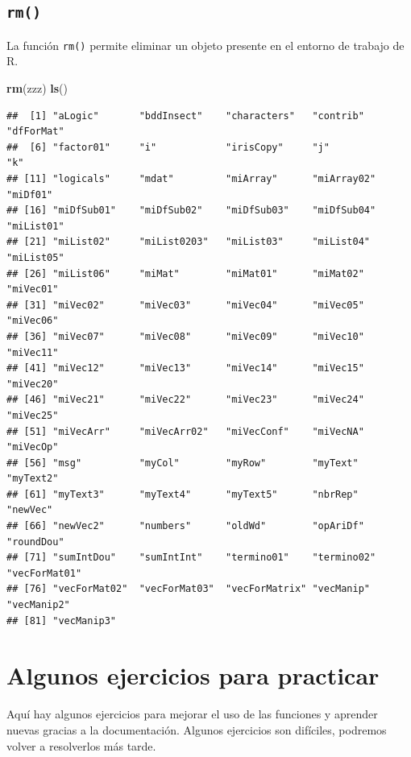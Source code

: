 \documentclass[
]{book}
\newenvironment{Shaded}{\begin{snugshade}}{\end{snugshade}}
\newcommand{\KeywordTok}[1]{\textcolor[rgb]{0.13,0.29,0.53}{\textbf{#1}}}
\newcommand{\NormalTok}[1]{#1}
\begin{document}
\hypertarget{l015rm}{%
\subsection{\texorpdfstring{\texttt{rm()}}{rm()}}\label{l015rm}}

La función \texttt{rm()} permite eliminar un objeto presente en el entorno de trabajo de R.

\begin{Shaded}
\begin{Highlighting}[]
\KeywordTok{rm}\NormalTok{(zzz)}
\KeywordTok{ls}\NormalTok{()}
\end{Highlighting}
\end{Shaded}

\begin{verbatim}
##  [1] "aLogic"       "bddInsect"    "characters"   "contrib"      "dfForMat"    
##  [6] "factor01"     "i"            "irisCopy"     "j"            "k"           
## [11] "logicals"     "mdat"         "miArray"      "miArray02"    "miDf01"      
## [16] "miDfSub01"    "miDfSub02"    "miDfSub03"    "miDfSub04"    "miList01"    
## [21] "miList02"     "miList0203"   "miList03"     "miList04"     "miList05"    
## [26] "miList06"     "miMat"        "miMat01"      "miMat02"      "miVec01"     
## [31] "miVec02"      "miVec03"      "miVec04"      "miVec05"      "miVec06"     
## [36] "miVec07"      "miVec08"      "miVec09"      "miVec10"      "miVec11"     
## [41] "miVec12"      "miVec13"      "miVec14"      "miVec15"      "miVec20"     
## [46] "miVec21"      "miVec22"      "miVec23"      "miVec24"      "miVec25"     
## [51] "miVecArr"     "miVecArr02"   "miVecConf"    "miVecNA"      "miVecOp"     
## [56] "msg"          "myCol"        "myRow"        "myText"       "myText2"     
## [61] "myText3"      "myText4"      "myText5"      "nbrRep"       "newVec"      
## [66] "newVec2"      "numbers"      "oldWd"        "opAriDf"      "roundDou"    
## [71] "sumIntDou"    "sumIntInt"    "termino01"    "termino02"    "vecForMat01" 
## [76] "vecForMat02"  "vecForMat03"  "vecForMatrix" "vecManip"     "vecManip2"   
## [81] "vecManip3"
\end{verbatim}

\hypertarget{algunos-ejercicios-para-practicar}{%
\section{Algunos ejercicios para practicar}\label{algunos-ejercicios-para-practicar}}

Aquí hay algunos ejercicios para mejorar el uso de las funciones y aprender nuevas gracias a la documentación. Algunos ejercicios son difíciles, podremos volver a resolverlos más tarde.
\end{document}
